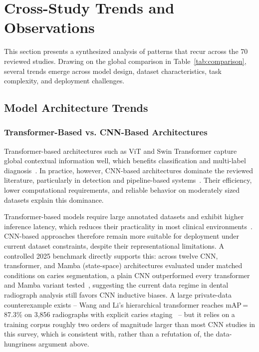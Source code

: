 \documentclass[conference]{IEEEtran}
\begin{document}
\section{Cross-Study Trends and Observations}

This section presents a synthesized analysis of patterns that recur across the 70 reviewed studies. Drawing on the global comparison in Table~\ref{tab:comparison}, several trends emerge across model design, dataset characteristics, task complexity, and deployment challenges.

\subsection{Model Architecture Trends}

\subsubsection{Transformer-Based vs. CNN-Based Architectures}

Transformer-based architectures such as ViT and Swin Transformer capture global contextual information well, which benefits classification and multi-label diagnosis~\cite{vannistelrooij2024combining}. In practice, however, CNN-based architectures dominate the reviewed literature, particularly in detection and pipeline-based systems~\cite{kaushik2025densenet201}. Their efficiency, lower computational requirements, and reliable behavior on moderately sized datasets explain this dominance.

Transformer-based models require large annotated datasets and exhibit higher inference latency, which reduces their practicality in most clinical environments~\cite{vannistelrooij2024combining}. CNN-based approaches therefore remain more suitable for deployment under current dataset constraints, despite their representational limitations. A controlled 2025 benchmark directly supports this: across twelve CNN, transformer, and Mamba (state-space) architectures evaluated under matched conditions on caries segmentation, a plain CNN outperformed every transformer and Mamba variant tested~\cite{ghimire2025cnns}, suggesting the current data regime in dental radiograph analysis still favors CNN inductive biases. A large private-data counterexample exists -- Wang and Li's hierarchical transformer reaches mAP\,=\,87.3\% on 3,856 radiographs with explicit caries staging~\cite{wang2026transformer} -- but it relies on a training corpus roughly two orders of magnitude larger than most CNN studies in this survey, which is consistent with, rather than a refutation of, the data-hungriness argument above.
\end{document}

